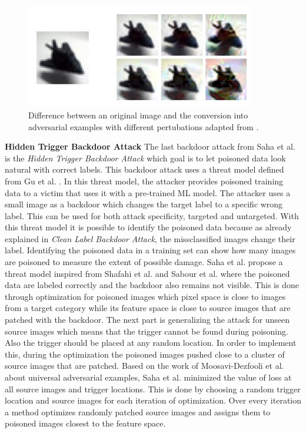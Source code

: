 \begin{figure}[ht!]
  \centering
  \includegraphics[width=10cm]{pictures/poisoned_clean_label.jpg}
  \caption{Difference between an original image and the conversion into adversarial examples with different pertubations adapted from \cite{turner2018clean}.}
  \label{fig:poisoned_clean_label}
\end{figure}

\textbf{Hidden Trigger Backdoor Attack} The last backdoor attack from Saha et al. \cite{DBLP:journals/corr/abs-1910-00033} is the \textit{Hidden Trigger Backdoor Attack} which goal is to let poisoned data look natural with correct labels. This backdoor attack uses a threat model defined from Gu et al. \cite{DBLP:journals/corr/abs-1708-06733}. In this threat model, the attacker provides poisoned training data to a victim that uses it with a pre-trained ML model. The attacker uses a small image as a backdoor which changes the target label to a specific wrong label. This can be used for both attack specificity, targeted and untargeted. With this threat model it is possible to identify the poisoned data because as already explained in \textit{Clean Label Backdoor Attack}, the missclassified images change their label. Identifying the poisoned data in a training set can show how many images are poisoned to measure the extent of possible damage. Saha et al. propose a threat model inspired
from Shafahi et al. \cite{DBLP:journals/corr/abs-1804-00792} and Sabour et al. \cite{DBLP:journals/corr/SabourCFF15} where the poisoned data are labeled correctly and the backdoor also remains not visible. This is done through optimization for poisoned images which pixel space is close to images from a target category while its feature space is close to source images that are patched with the backdoor. The next part is generalizing the attack for unseen source images which means that the trigger cannot be found during poisoning. Also the trigger should be placed at any random location. In order to implement this, during the optimization the poisoned images pushed close to a cluster of source images that are patched. Based on the
work of Moosavi-Dezfooli et al. \cite{DBLP:conf/cvpr/Moosavi-Dezfooli17} about universal adversarial examples, Saha et al. minimized the value of loss at all source images and trigger locations. This is done by choosing a random trigger location and source images for each iteration of optimization. Over every iteration a method optimizes randomly patched source images and assigns them to poisoned images closest to the feature space.

